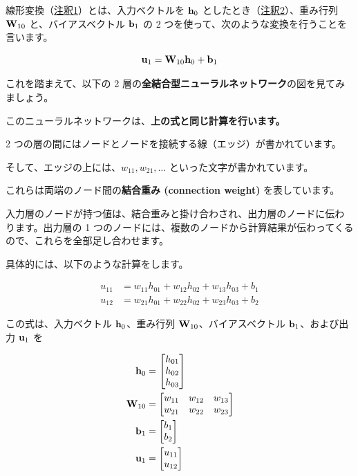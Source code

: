 線形変換（\hyperref[23-basics-of-neural-networks-note1]{注釈1}）とは、入力ベクトルを ${\bf h}_0$ としたとき（\hyperref[23-basics-of-neural-networks-note2]{注釈2}）、重み行列 ${\bf W}_{10}$ と、バイアスベクトル ${\bf b}_1$ の 2 つを使って、次のような変換を行うことを言います。


\[
{\bf u}_1 = {\bf W}_{10}{\bf h}_0 + {\bf b}_1
\]


これを踏まえて、以下の 2 層の\textbf{全結合型ニューラルネットワーク}の図を見てみましょう。




このニューラルネットワークは、\textbf{上の式と同じ計算を行います。}

2 つの層の間にはノードとノードを接続する線（エッジ）が書かれています。

そして、エッジの上には、$w_{11}, w_{21}, \dots$ といった文字が書かれています。

これらは両端のノード間の\textbf{結合重み (connection weight)} を表しています。


入力層のノードが持つ値は、結合重みと掛け合わされ、出力層のノードに伝わります。出力層の 1 つのノードには、複数のノードから計算結果が伝わってくるので、これらを全部足し合わせます。


具体的には、以下のような計算をします。


\begin{align}
u_{11} &= w_{11} h_{01} + w_{12} h_{02} + w_{13} h_{03} + b_{1} \\
u_{12} &= w_{21} h_{01} + w_{22} h_{02} + w_{23} h_{03} + b_{2}
\end{align}


この式は、入力ベクトル ${\bf h}_0$、重み行列 ${\bf W}_{10}$、バイアスベクトル ${\bf b}_1$、および出力 ${\bf u}_1$ を


\begin{align}
{\bf h}_{0} &=
\begin{bmatrix}
h_{01} \\
h_{02} \\
h_{03}
\end{bmatrix} \\
{\bf W}_{10} &=
\begin{bmatrix}
w_{11} & w_{12} & w_{13} \\
w_{21} & w_{22} & w_{23}
\end{bmatrix} \\
{\bf b}_1 &=
\begin{bmatrix}
b_{1} \\
b_{2}
\end{bmatrix} \\
{\bf u}_1 &=
\begin{bmatrix}
u_{11} \\
u_{12}
\end{bmatrix}
\end{align}


